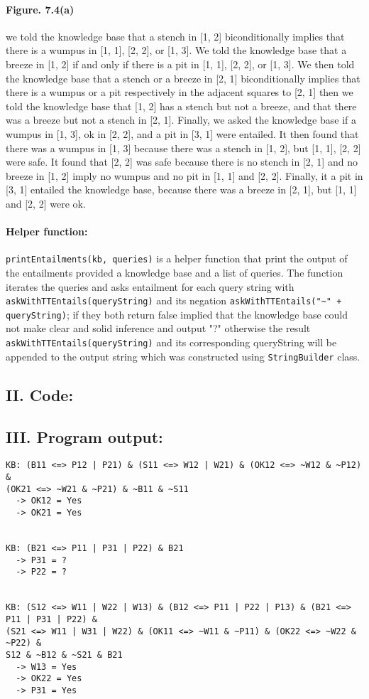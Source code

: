 \documentclass[a4paper]{report}
\begin{document}
\paragraph{Figure. 7.4(a) } we told the knowledge base that a stench in [1, 2] biconditionally implies that there is a wumpus in [1, 1], [2, 2], or [1, 3]. We told the knowledge base that a breeze in [1, 2] if and only if there is a pit in [1, 1], [2, 2], or [1, 3]. We then told the knowledge base that a stench or a breeze in [2, 1] biconditionally implies that there is a wumpus or a pit respectively in the adjacent squares to [2, 1] then we told the knowledge base that [1, 2] has a stench but not a breeze, and that there was a breeze but not a stench in [2, 1]. Finally, we asked the knowledge base if a wumpus in [1, 3], ok in [2, 2], and a pit in [3, 1] were entailed. It then found that there was a wumpus in [1, 3] because there was a stench in [1, 2], but [1, 1], [2, 2] were safe. It found that [2, 2] was safe because there is no stench in [2, 1] and no breeze in [1, 2] imply no wumpus and no pit in [1, 1] and [2, 2]. Finally, it a pit in [3, 1] entailed the knowledge base, because there was a breeze in [2, 1], but [1, 1] and [2, 2] were ok. \\

\paragraph{Helper function: } \texttt{printEntailments(kb, queries)} is a helper function that print the output of the entailments provided a knowledge base and a list of queries. The function iterates the queries and asks entailment for each query string with \texttt{askWithTTEntails(queryString)} and its negation \texttt{askWithTTEntails("\textasciitilde{}" + queryString)}; if they both return false implied that the knowledge base could not make clear and solid inference and output "?" otherwise the result \texttt{askWithTTEntails(queryString)} and its corresponding queryString will be appended to the output string which was constructed using \texttt{StringBuilder} class.

\subsection*{II. Code:}


\subsection*{III. Program output:}

\begin{verbatim}
KB: (B11 <=> P12 | P21) & (S11 <=> W12 | W21) & (OK12 <=> ~W12 & ~P12) & 
(OK21 <=> ~W21 & ~P21) & ~B11 & ~S11
  -> OK12 = Yes
  -> OK21 = Yes


KB: (B21 <=> P11 | P31 | P22) & B21
  -> P31 = ?
  -> P22 = ?


KB: (S12 <=> W11 | W22 | W13) & (B12 <=> P11 | P22 | P13) & (B21 <=> P11 | P31 | P22) & 
(S21 <=> W11 | W31 | W22) & (OK11 <=> ~W11 & ~P11) & (OK22 <=> ~W22 & ~P22) & 
S12 & ~B12 & ~S21 & B21
  -> W13 = Yes
  -> OK22 = Yes
  -> P31 = Yes
\end{verbatim}
\end{document}
